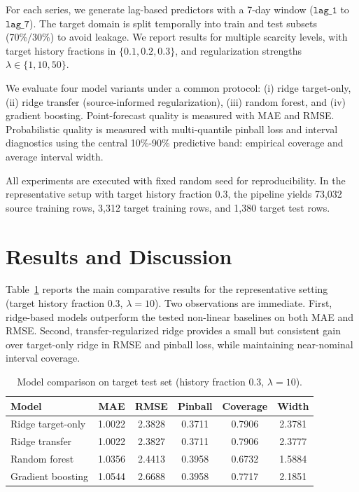 \documentclass[3p,times,procedia]{elsarticle}
\begin{document}
For each series, we generate lag-based predictors with a 7-day window ($\texttt{lag\_1}$ to $\texttt{lag\_7}$). The target domain is split temporally into train and test subsets (70\%/30\%) to avoid leakage. We report results for multiple scarcity levels, with target history fractions in $\{0.1,0.2,0.3\}$, and regularization strengths $\lambda\in\{1,10,50\}$.

We evaluate four model variants under a common protocol: (i) ridge target-only, (ii) ridge transfer (source-informed regularization), (iii) random forest, and (iv) gradient boosting. Point-forecast quality is measured with MAE and RMSE. Probabilistic quality is measured with multi-quantile pinball loss and interval diagnostics using the central 10\%-90\% predictive band: empirical coverage and average interval width.

All experiments are executed with fixed random seed for reproducibility. In the representative setup with target history fraction $0.3$, the pipeline yields 73,032 source training rows, 3,312 target training rows, and 1,380 target test rows.

\section{Results and Discussion}
Table~\ref{tab:model-comparison} reports the main comparative results for the representative setting (target history fraction $0.3$, $\lambda=10$). Two observations are immediate. First, ridge-based models outperform the tested non-linear baselines on both MAE and RMSE. Second, transfer-regularized ridge provides a small but consistent gain over target-only ridge in RMSE and pinball loss, while maintaining near-nominal interval coverage.

\begin{table}[h]
\centering
\caption{Model comparison on target test set (history fraction $0.3$, $\lambda=10$).}
\label{tab:model-comparison}
\begin{tabular}{lccccc}
\hline
Model & MAE & RMSE & Pinball & Coverage & Width \\
\hline
Ridge target-only & 1.0022 & 2.3828 & 0.3711 & 0.7906 & 2.3781 \\
Ridge transfer & 1.0022 & 2.3827 & 0.3711 & 0.7906 & 2.3777 \\
Random forest & 1.0356 & 2.4413 & 0.3958 & 0.6732 & 1.5884 \\
Gradient boosting & 1.0544 & 2.6688 & 0.3958 & 0.7717 & 2.1851 \\
\hline
\end{tabular}
\end{table}
\end{document}
